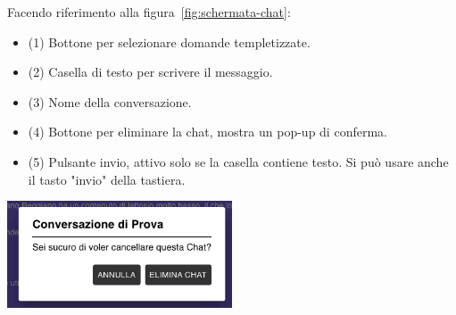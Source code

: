 Facendo riferimento alla figura~\ref{fig:schermata-chat}:

\begin{itemize}
    \item (1) Bottone per selezionare domande templetizzate.
    \item (2) Casella di testo per scrivere il messaggio.
    \item (3) Nome della conversazione.
    \item (4) Bottone per eliminare la chat, mostra un pop-up di conferma.
    \item (5) Pulsante invio, attivo solo se la casella contiene testo. Si può usare anche il tasto "invio" della tastiera.
\end{itemize}

\begin{center}
    \label{fig:domanda templetizzata}
\end{center}

\begin{center}
    \includegraphics[width=0.5\textwidth]{./img/eliminaChat.png}
    \label{fig:elimina-chat}
\end{center}

